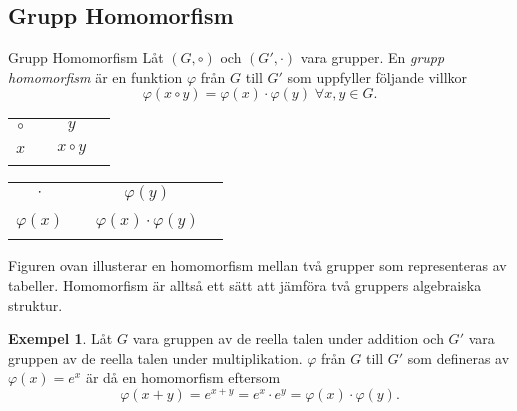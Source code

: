 \documentclass{article}
\theoremstyle{definition}
\newtheorem{exmp}[thm]{Exempel}
\begin{document}
\subsection{Grupp Homomorfism}
\begin{mydef}{Grupp Homomorfism}{}
  Låt $(G, \circ)$ och $(G', \cdot)$ vara grupper. 
  En \textit{grupp homomorfism} är en funktion $\varphi$ från $G$ till $G'$ som 
  uppfyller följande villkor
  \[\varphi (x \circ y) = \varphi (x) \cdot \varphi (y) \; \forall x, y \in G.\]
\end{mydef}

\begin{center}{}
    \begin{tabular}{c | c c c}
      $\circ$ &  & $y$ &\\
      \cline{1-4}
      &  &  & \\
      $x$ &  & $x \circ y$ & \\
      &  &  & \\
    \end{tabular} 
    \quad
    \quad
    \begin{tabular}{c | c c c}
      $\cdot$ &  & $\varphi(y)$ &\\
      \cline{1-4}
      &  &  & \\
      $\varphi(x)$ &  & $\varphi(x) \cdot \varphi(y)$ & \\
      &  &  & \\
    \end{tabular} 
\end{center}
Figuren ovan illusterar en homomorfism mellan två grupper som representeras av tabeller.
Homomorfism är alltså ett sätt att jämföra två gruppers algebraiska struktur. 

\hypertarget{exmp4.7}{}
\begin{exmp}
  Låt $G$ vara gruppen av de reella talen under addition och $G'$ vara gruppen av de reella 
  talen under multiplikation. $\varphi$ från $G$ till $G'$ som defineras 
  av $\varphi(x) = e^x$ är då en homomorfism eftersom
  \[\varphi(x + y) = e^{x+y} = e^x \cdot e^y = \varphi(x) \cdot \varphi(y).\]
\end{exmp}
\end{document}
